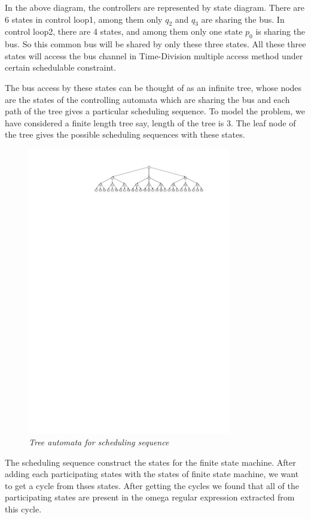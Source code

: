 In the above diagram, the controllers are represented by state diagram. 
There are 6 states in control loop1, among them only $q_2$ 
and $q_3$ are sharing the bus. In control loop2, there are 4 states, and among them
only one state $p_0$ is sharing the bus. So this common bus will be shared by only
these three states. All these three states will access the bus channel in Time-Division 
multiple access method under certain schedulable constraint. 

The bus access by these states can be thought of as an infinite tree, whose nodes 
are the states of the controlling automata which are sharing the bus and
each path of the tree gives a particular scheduling sequence. To model the problem,
we have considered a finite length tree say, length of the tree is 3. The leaf node of the tree
gives the possible scheduling sequences with these states.

\begin{figure}[h]
\begin{center}
\includegraphics[width=3.5in]{tree_automata.pdf}
\end{center}
\vspace{-0.1in}
\caption{{\em Tree automata for scheduling sequence }}
\label{fig:automaton}
\end{figure}

The scheduling sequence construct the states for the finite state machine. After adding
each participating states with the states of finite state machine, we want to get a cycle from
thses states. After getting the cycles we found that all of the participating states are
present in the omega regular expression extracted from this cycle.

